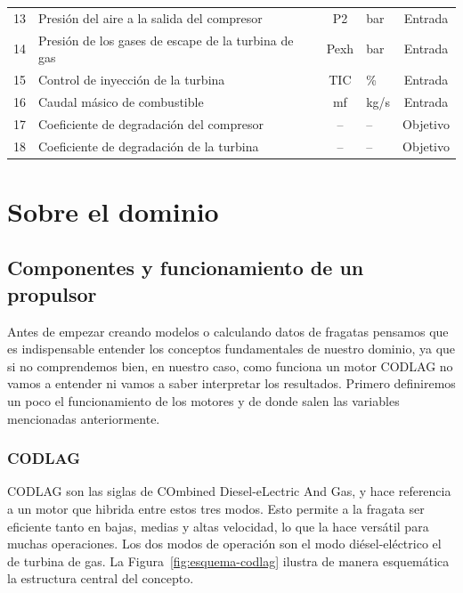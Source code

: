 \documentclass[a4paper]{article}
\begin{document}
\begin{table}[htbp]
{\begin{tabular}{c l c l c}
        13 & Presión del aire a la salida del compresor & P2 & bar & Entrada \\
        14 & Presión de los gases de escape de la turbina de gas & Pexh & bar & Entrada \\
        15 & Control de inyección de la turbina & TIC & \% & Entrada \\
        16 & Caudal másico de combustible & mf & kg/s & Entrada \\
        \hline
        17 & Coeficiente de degradación del compresor & -- & -- & Objetivo \\
        18 & Coeficiente de degradación de la turbina & -- & -- & Objetivo \\
        \hline
    \end{tabular}%
    }
\end{table}

\section{Sobre el dominio}
  
  \subsection{Componentes y funcionamiento de un propulsor}
 Antes de empezar creando modelos o calculando datos de fragatas pensamos que es indispensable entender los conceptos fundamentales de nuestro dominio, ya que si no comprendemos bien, en nuestro caso, como funciona un motor CODLAG no vamos a entender ni vamos a saber interpretar los resultados. Primero definiremos un poco el funcionamiento de los motores y de donde salen las variables mencionadas anteriormente.
    
    \subsubsection{CODLAG}
    \label{sec:codlag}
    CODLAG son las siglas de COmbined Diesel-eLectric And Gas, y hace referencia a un motor que hibrida entre estos tres modos. Esto permite a la fragata ser eficiente tanto en bajas, medias y altas velocidad, lo que la hace versátil para muchas operaciones. Los dos modos de operación son el modo diésel-eléctrico el de turbina de gas. La Figura~\ref{fig:esquema-codlag} ilustra de manera esquemática la estructura central del concepto.
\end{document}
